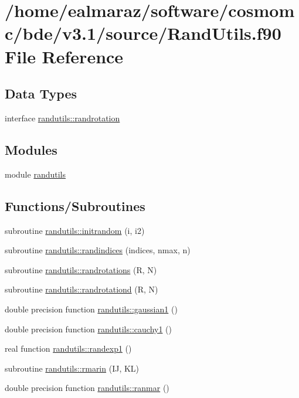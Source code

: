 \hypertarget{RandUtils_8f90}{}\section{/home/ealmaraz/software/cosmomc/bde/v3.1/source/\+Rand\+Utils.f90 File Reference}
\label{RandUtils_8f90}
\subsection*{Data Types}
\begin{DoxyCompactItemize}
\item 
interface \mbox{\hyperlink{interfacerandutils_1_1randrotation}{randutils\+::randrotation}}
\end{DoxyCompactItemize}
\subsection*{Modules}
\begin{DoxyCompactItemize}
\item 
module \mbox{\hyperlink{namespacerandutils}{randutils}}
\end{DoxyCompactItemize}
\subsection*{Functions/\+Subroutines}
\begin{DoxyCompactItemize}
\item 
subroutine \mbox{\hyperlink{namespacerandutils_a6f074e631d2bdae8023911e26f56d7aa}{randutils\+::initrandom}} (i, i2)
\item 
subroutine \mbox{\hyperlink{namespacerandutils_ad5f2ab70ffa569eab34dede61e38f4a0}{randutils\+::randindices}} (indices, nmax, n)
\item 
subroutine \mbox{\hyperlink{namespacerandutils_ad86fd161689210aee49bc794d76ceda5}{randutils\+::randrotations}} (R, N)
\item 
subroutine \mbox{\hyperlink{namespacerandutils_a2231f6417e95a0e41e8f024aaa89445f}{randutils\+::randrotationd}} (R, N)
\item 
double precision function \mbox{\hyperlink{namespacerandutils_a9279fa2584213af31977f47ef3ea77e7}{randutils\+::gaussian1}} ()
\item 
double precision function \mbox{\hyperlink{namespacerandutils_a6a11e93bb549c94d47ae94f4e6ac8c49}{randutils\+::cauchy1}} ()
\item 
real function \mbox{\hyperlink{namespacerandutils_a4ab2d2d677da8e5a41e18804782dd952}{randutils\+::randexp1}} ()
\item 
subroutine \mbox{\hyperlink{namespacerandutils_ae91e8d9448da0877857bf6ae466c210d}{randutils\+::rmarin}} (IJ, KL)
\item 
double precision function \mbox{\hyperlink{namespacerandutils_a6065ecd619b0a63bceabcecdde031a2c}{randutils\+::ranmar}} ()
\end{DoxyCompactItemize}
